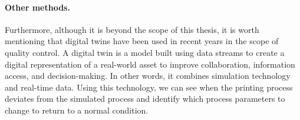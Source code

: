 \paragraph{Other methods.} Furthermore, although it is beyond the scope of this thesis, it is worth mentioning that digital twins have been used in recent years in the scope of quality control. A digital twin is a model built using data streams to create a digital representation of a real-world asset to improve collaboration, information access, and decision-making. In other words, it combines simulation technology and real-time data. Using this technology, we can see when the printing process deviates from the simulated process and identify which process parameters to change to return to a normal condition.
